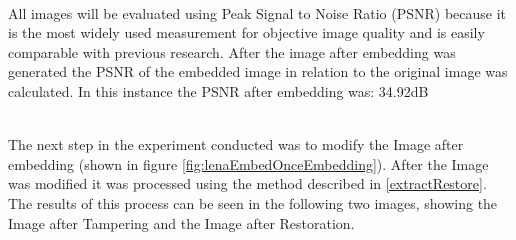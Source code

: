 \documentclass[12pt]{article}
\begin{document}
\hspace{0pt} \\
All images will be evaluated using Peak Signal to Noise Ratio (PSNR) because it is the most widely used measurement for objective image quality and is easily comparable with previous research. \cite{wang2002image}
After the image after embedding was generated the PSNR of the embedded image in relation to the original image was calculated.
In this instance the PSNR after embedding was: 34.92dB 

\hspace{0pt} \\
The next step in the experiment conducted was to modify the Image after embedding (shown in figure \ref{fig:lenaEmbedOnceEmbedding}).
After the Image was modified it was processed using the method described in \ref{extractRestore}.
The results of this process can be seen in the following two images, showing the Image after Tampering and the Image after Restoration.
\end{document}
